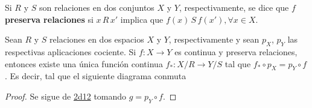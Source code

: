 

\begin{definition}
Si $R$ y $S$ son relaciones en dos conjuntos $X$ y $Y$, respectivamente, se dice que $f$ \textbf{preserva relaciones} si $x \, R \, x'$ implica que $f(x) \, S \, f(x'), \forall x \in X$.
\end{definition}

\begin{corollary}
Sean $R$ y $S$ relaciones en dos espacios $X$ y $Y$, respectivamente y sean $p_X$, $p_Y$ las respectivas aplicaciones cociente. Si $f : X \longrightarrow Y$ es continua y preserva relaciones, entonces existe una única función continua $f_* : X/R \longrightarrow Y/S$ tal que $f_* \circ p_X = p_Y \circ f$. Es decir, tal que el siguiente diagrama conmuta 
\bigskip

\end{corollary}

\begin{proof}
Se sigue de \hyperref[card:2d12]{\textsf{2d12}} tomando $g = p_Y \circ f$.
\end{proof}
